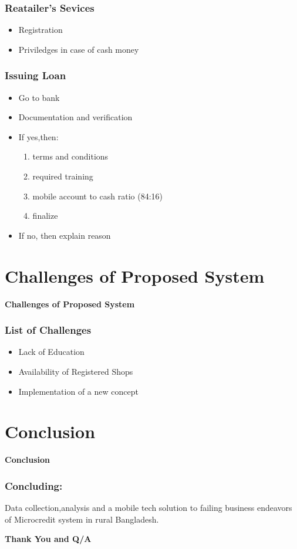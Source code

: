 \documentclass{beamer}
\begin{document}
\begin{frame}
\frametitle{Reatailer's Sevices}
\begin{itemize}
\item Registration
\item Priviledges in case of cash money
\end{itemize}
\end{frame}

\begin{frame}
\frametitle{Issuing Loan}
\begin{itemize}
\item Go to bank
\item Documentation and verification
\item If yes,then:
\begin{enumerate}
\item terms and conditions
\item required training
\item mobile account to cash ratio (84:16)
\item finalize
\end{enumerate}
\item If no, then explain reason
\end{itemize}
\end{frame}



\section{Challenges of Proposed System}
\begin{frame}
\begin{center}
{\LARGE \textbf{Challenges of Proposed System}}
\end{center}
\end{frame}


\begin{frame}
\frametitle{List of Challenges}
\begin{itemize}
\item Lack of Education
\item Availability of Registered Shops
\item Implementation of a new concept
\end{itemize}
\end{frame}

\section{Conclusion}
\begin{frame}
\begin{center}
{\LARGE \textbf{Conclusion}}
\end{center}
\end{frame}


\begin{frame}
\frametitle{Concluding:}
\begin{center}
Data collection,analysis and a mobile tech solution to failing business endeavors of Microcredit system in rural Bangladesh.
\end{center}
\end{frame}




\begin{frame}
\begin{center}
{\LARGE \textbf{Thank You and Q/A}}
\end{center}
\end{frame}
\end{document}
